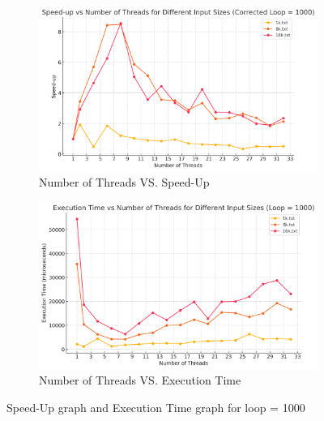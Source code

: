 \documentclass[letterpaper,12pt]{article}
\theoremstyle{remark}
\begin{document}
\hfill  %

\begin{figure}[H]
    \centering
    \begin{subfigure}[t]{0.48\textwidth}  %
        \centering
        \includegraphics[width=\textwidth]{loop1000Yield.png}
        \caption{Number of Threads VS. Speed-Up}
        \label{fig:ThreadVsSpeedUp1}
    \end{subfigure}
    \hfill  %
    \begin{subfigure}[t]{0.48\textwidth}  %
        \centering
        \includegraphics[width=\textwidth]{loop1000YieldExecutionTime.png}
        \caption{Number of Threads VS. Execution Time}
        \label{fig:ThreadVsExecutionTime}
    \end{subfigure}
    \caption{Speed-Up graph and Execution Time graph for loop = 1000}
    \label{fig:ThreadVsComparison}
\end{figure}
\hfill  %
\end{document}
